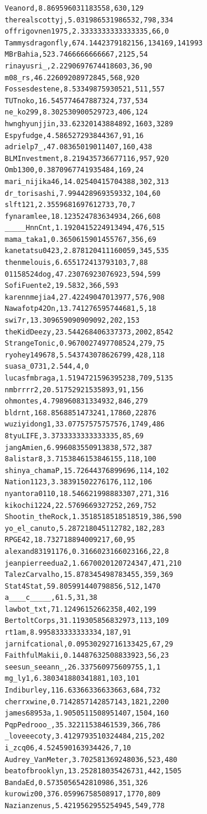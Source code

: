\begin{verbatim}
Veanord,8.869596031183558,630,129
therealscottyj,5.031986531986532,798,334
offrigovnen1975,2.3333333333333335,66,0
Tammysdragonfly,674.1442379182156,134169,141993
MBrBahia,523.7466666666667,2125,54
rinayusri_,2.2290697674418603,36,90
m08_rs,46.22609208972845,568,920
Fossesdestene,8.53349875930521,511,557
TUTnoko,16.545774647887324,737,534
ne_ko299,8.302530900529723,406,124
hwnghyunjjin,33.62320143884892,1603,3289
Espyfudge,4.586527293844367,91,16
adrielp7_,47.08365019011407,160,438
BLMInvestment,8.219435736677116,957,920
Omb1300,0.3870967741935484,169,24
mari_nijika46,14.02540415704388,302,313
dr_torisashi,7.994428969359332,104,60
slft121,2.3559681697612733,70,7
fynaramlee,18.123524783634934,266,608
_____HnnCnt,1.1920415224913494,476,515
mama_taka1,0.3650615901455767,356,69
kanetatsu0423,2.878120411160059,345,535
thenmelouis,6.655172413793103,7,88
01158524dog,47.23076923076923,594,599
SofiFuente2,19.5832,366,593
karennmejia4,27.42249047013977,576,908
Nawafotp42On,13.741276595744681,5,18
swi7r,13.309659090909092,202,153
theKidDeezy,23.544268406337373,2002,8542
StrangeTonic,0.9670027497708524,279,75
ryohey149678,5.543743078626799,428,118
suasa_0731,2.544,4,0
lucasfmbraga,1.5194721596395238,709,5135
nmbrrrr2,20.51752921535893,91,156
ohmontes,4.798960831334932,846,279
bldrnt,168.8568851473241,17860,22876
wuziyidong1,33.07757575757576,1749,486
8tyuLIFE,3.3733333333333335,85,69
jangAmien,6.996083550913838,572,387
8alistar8,3.7153846153846155,118,100
shinya_chamaP,15.72644376899696,114,102
Nation1123,3.38391502276176,112,106
nyantora0110,18.546621998883307,271,316
kikochi1224,22.5769669327252,269,752
Shootin_theRock,1.3518518518518519,386,590
yo_el_canuto,5.287218045112782,182,283
RPGE42,18.732718894009217,60,95
alexand83191176,0.3166023166023166,22,8
jeanpierreedua2,1.6670020120724347,471,210
TalezCarvalho,15.878345498783455,359,369
Stat4Stat,59.805991440798856,512,1470
a____c_____,61.5,31,38
lawbot_txt,71.12496152662358,402,199
BertoltCorps,31.119305856832973,113,109
rt1am,8.995833333333334,187,91
jarnifcational,0.09530292716133425,67,29
FaithfulMakii,0.14487632508833923,56,23
seesun_seeann_,26.337560975609755,1,1
mg_ly1,6.380341880341881,103,101
Indiburley,116.63366336633663,684,732
cherrxwine,0.7142857142857143,1821,2200
james68953a,1.9050511508951407,1504,160
PqpPedrooo_,35.32211538461539,366,786
_loveeecoty,3.4129793510324484,215,202
i_zcq06,4.524590163934426,7,10
Audrey_VanMeter,3.702581369248036,523,480
beatofbrooklyn,13.252818035426731,442,1505
BandaEd,0.5735056542810986,351,326
kurowiz00,376.05996758508917,1770,809
Nazianzenus,5.4219562955254945,549,778

\end{verbatim}

